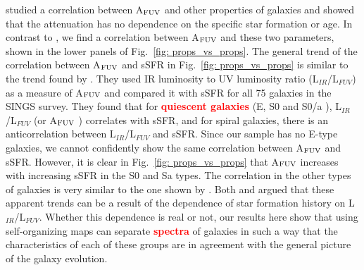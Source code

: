          studied a correlation between A$_{\rm {FUV}}$ and other properties of galaxies and showed that the attenuation has no dependence on the specific star formation or age.
        In contrast to , we find a correlation between A$_{\rm {FUV}}$ and these two parameters, shown in the lower panels of Fig.~\ref{fig: props_vs_props}.
        The general trend of the correlation between A$_{\rm {FUV}}$ and sSFR in Fig.~\ref{fig: props_vs_props} is similar to the trend found by \cite{Dale07}.
        They used IR luminosity to UV luminosity ratio (L$_{IR}$/L$_{FUV}$) as a measure of A$_{\rm {FUV}}$ and compared it with sSFR for all 75 galaxies in the SINGS survey.
        They found that for \textbf{\textcolor{red}{quiescent galaxies}} (E, S0 and S0/a ), L$_{IR}$/L$_{FUV}$ (or A$_{\rm {FUV}}$ ) correlates with sSFR, and for spiral galaxies, there is an anticorrelation between L$_{IR}$/L$_{FUV}$ and sSFR.
       Since our sample has no E-type galaxies, we cannot confidently show the same correlation between A$_{\rm {FUV}}$ and sSFR. 
        However, it is clear in Fig.~\ref{fig: props_vs_props} that A$_{\rm {FUV}}$ increases with increasing sSFR in the S0 and Sa types.
        The correlation in the other types of galaxies is very similar to the one shown by \cite{Dale07}.
        Both \cite{Dale07} and  argued that these apparent trends can be a result of the dependence of star formation history on L$_{IR}$/L$_{FUV}$.
        Whether this dependence is real or not, our results here show that using self-organizing maps can separate \textbf{\textcolor{red}{spectra}} of galaxies in such a way that the characteristics of each of these groups are in agreement with the general picture of the galaxy evolution.
      
